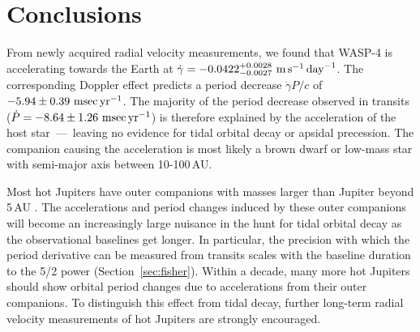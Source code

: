 \documentclass[12pt,twocolumn,tighten]{aastex62}
\begin{document}
\section{Conclusions}
\label{sec:conclusions}

From newly acquired radial velocity measurements, we found that WASP-4
is accelerating towards the Earth at $\dot{\gamma} =
-0.0422^{+0.0028}_{-0.0027}\ {\rm m}\,{\rm s}^{-1}\,{\rm day}^{-1}$.
The corresponding Doppler effect predicts a period decrease
$\dot{\gamma} P/c$ of $-5.94 \pm 0.39~{\rm msec}\,{\rm yr}^{-1}$.  The
majority of the period decrease observed in transits ($\dot{P}= - 8.64
\pm 1.26~{\rm msec}\,{\rm yr}^{-1}$) is therefore explained by the
acceleration of the host star~---~leaving no evidence for tidal
orbital decay or apsidal precession.  The companion causing the
acceleration is most likely a brown dwarf or low-mass star with
semi-major axis between 10-100$\,$AU.

Most hot Jupiters have outer companions with masses larger than
Jupiter beyond 5$\,$AU
\citep{knutson_friends_2014,bryan_statistics_2016}. The accelerations
and period changes induced by these outer companions will become an
increasingly large nuisance in the hunt for tidal orbital decay as the
observational baselines get longer.  In particular, the precision with
which the period derivative can be measured from transits scales with
the baseline duration to the 5/2 power (Section~\ref{sec:fisher}).
Within a decade, many more hot Jupiters should show orbital period
changes due to accelerations from their outer companions.  To
distinguish this effect from tidal decay, further long-term radial
velocity measurements of hot Jupiters are strongly encouraged.

\end{document}

